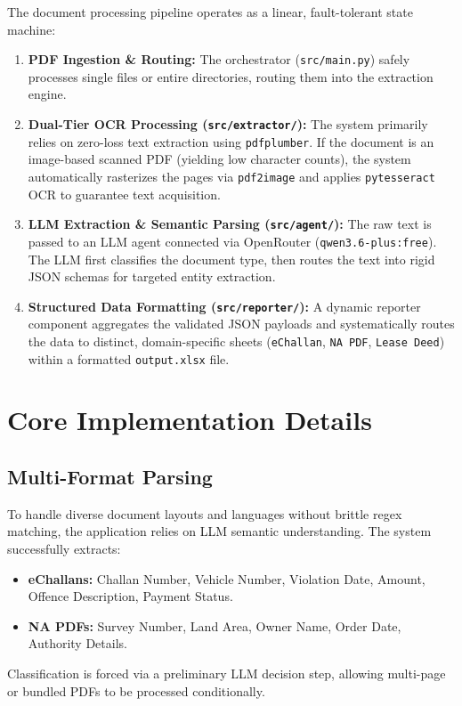 \documentclass[11pt]{article}
\begin{document}
The document processing pipeline operates as a linear, fault-tolerant state machine:
\begin{enumerate}[label=\arabic*.]
    \item \textbf{PDF Ingestion \& Routing:} The orchestrator (\texttt{src/main.py}) safely processes single files or entire directories, routing them into the extraction engine.
    \item \textbf{Dual-Tier OCR Processing (\texttt{src/extractor/}):} The system primarily relies on zero-loss text extraction using \texttt{pdfplumber}. If the document is an image-based scanned PDF (yielding low character counts), the system automatically rasterizes the pages via \texttt{pdf2image} and applies \texttt{pytesseract} OCR to guarantee text acquisition.
    \item \textbf{LLM Extraction \& Semantic Parsing (\texttt{src/agent/}):} The raw text is passed to an LLM agent connected via OpenRouter (\texttt{qwen3.6-plus:free}). The LLM first classifies the document type, then routes the text into rigid JSON schemas for targeted entity extraction.
    \item \textbf{Structured Data Formatting (\texttt{src/reporter/}):} A dynamic reporter component aggregates the validated JSON payloads and systematically routes the data to distinct, domain-specific sheets (\texttt{eChallan}, \texttt{NA PDF}, \texttt{Lease Deed}) within a formatted \texttt{output.xlsx} file.
\end{enumerate}

\section{Core Implementation Details}

\subsection{Multi-Format Parsing}
To handle diverse document layouts and languages without brittle regex matching, the application relies on LLM semantic understanding. The system successfully extracts:
\begin{itemize}
    \item \textbf{eChallans:} Challan Number, Vehicle Number, Violation Date, Amount, Offence Description, Payment Status.
    \item \textbf{NA PDFs:} Survey Number, Land Area, Owner Name, Order Date, Authority Details.
\end{itemize}
Classification is forced via a preliminary LLM decision step, allowing multi-page or bundled PDFs to be processed conditionally.
\end{document}
